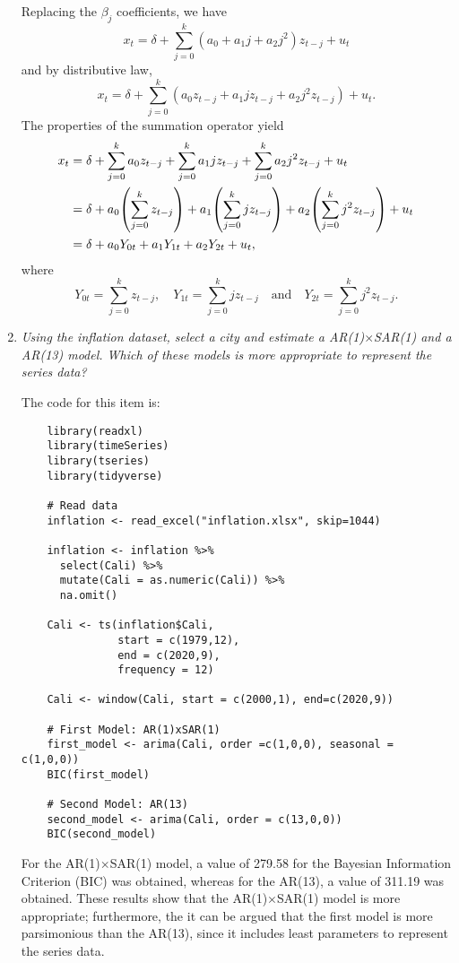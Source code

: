 \documentclass[fleqn]{article}
\let\originalleft\left
\let\originalright\right
\renewcommand{\left}{\mathopen{}\mathclose\bgroup\originalleft}
\renewcommand{\right}{\aftergroup\egroup\originalright}
\begin{document}
\begin{enumerate}
    Replacing the $\beta_j$ coefficients, we have
    \[
    x_t=\delta + \sum_{j=0}^k(a_0+a_1j+a_2j^2)z_{t-j} + u_t
    \]
    and by distributive law,
    \[
    x_t=\delta + \sum_{j=0}^k(a_0z_{t-j}+a_1jz_{t-j}+a_2j^2z_{t-j}) + u_t.
    \]
    The properties of the summation operator yield
    \[
    \begin{split}
        x_t&=\delta + \sum_{j=0}^ka_0z_{t-j}+\sum_{j=0}^ka_1jz_{t-j}+\sum_{j=0}^ka_2j^2z_{t-j} + u_t\\
        &=\delta +a_0\left(\sum_{j=0}^kz_{t-j}\right)+a_1\left(\sum_{j=0}^kjz_{t-j}\right)+a_2\left(\sum_{j=0}^kj^2z_{t-j}\right) + u_t\\
        &=\delta+a_0Y_{0t}+a_1Y_{1t}+a_2Y_{2t}+u_t,
    \end{split}
    \]
    where
    \[
    Y_{0t}=\sum_{j=0}^kz_{t-j},\quad Y_{1t}=\sum_{j=0}^kjz_{t-j}\quad\text{and}\quad Y_{2t}=\sum_{j=0}^kj^2z_{t-j}.
    \]
    \item \textit{Using the inflation dataset, select a city and estimate a AR(1)$\times$SAR(1) and a AR(13) model. Which of these models is more appropriate to represent the series data?}
    
    The code for this item is:
    \begin{verbatim}
    library(readxl)
    library(timeSeries)
    library(tseries)
    library(tidyverse)
    
    # Read data
    inflation <- read_excel("inflation.xlsx", skip=1044)
    
    inflation <- inflation %>%
      select(Cali) %>%
      mutate(Cali = as.numeric(Cali)) %>%
      na.omit()
    
    Cali <- ts(inflation$Cali,
               start = c(1979,12),
               end = c(2020,9),
               frequency = 12)
    
    Cali <- window(Cali, start = c(2000,1), end=c(2020,9))
    
    # First Model: AR(1)xSAR(1)
    first_model <- arima(Cali, order =c(1,0,0), seasonal = c(1,0,0))
    BIC(first_model)
    
    # Second Model: AR(13)
    second_model <- arima(Cali, order = c(13,0,0))
    BIC(second_model)
    \end{verbatim}
    For the AR(1)$\times$SAR(1) model, a value of 279.58 for the Bayesian Information Criterion (BIC) was obtained, whereas for the AR(13), a value of 311.19 was obtained. These results show that the AR(1)$\times$SAR(1) model is more appropriate; furthermore, the it can be argued that the first model is more parsimonious than the AR(13), since it includes least parameters to represent the series data.
\end{enumerate}
\end{document}
